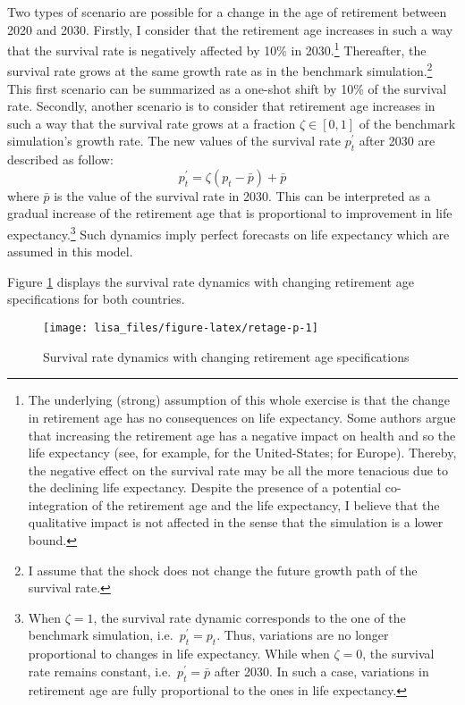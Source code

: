 \documentclass[
]{article}
\begin{document}
Two types of scenario are possible for a change in the age of retirement between 2020 and 2030. Firstly, I consider that the retirement age increases in such a way that the survival rate is negatively affected by 10\% in 2030.\footnote{The underlying (strong) assumption of this whole exercise is that the change in retirement age has no consequences on life expectancy. Some authors argue that increasing the retirement age has a negative impact on health and so the life expectancy (see, for example, \citet{Insler2014} for the United-States; \citet{Coe2011} for Europe). Thereby, the negative effect on the survival rate may be all the more tenacious due to the declining life expectancy. Despite the presence of a potential co-integration of the retirement age and the life expectancy, I believe that the qualitative impact is not affected in the sense that the simulation is a lower bound.} Thereafter, the survival rate grows at the same growth rate as in the benchmark simulation.\footnote{I assume that the shock does not change the future growth path of the survival rate.} This first scenario can be summarized as a one-shot shift by 10\% of the survival rate. Secondly, another scenario is to consider that retirement age increases in such a way that the survival rate grows at a fraction \(\zeta \in \left[0,1\right]\) of the benchmark simulation's growth rate. The new values of the survival rate \(p^\prime_t\) after 2030 are described as follow:
\begin{equation*}
    p^\prime_t = \zeta(p_t - \bar{p}) + \bar{p}
\end{equation*}
where \(\bar{p}\) is the value of the survival rate in 2030. This can be interpreted as a gradual increase of the retirement age that is proportional to improvement in life expectancy.\footnote{When \(\zeta = 1\), the survival rate dynamic corresponds to the one of the benchmark simulation, i.e.~\(p_t^\prime = p_t\). Thus, variations are no longer proportional to changes in life expectancy. While when \(\zeta = 0\), the survival rate remains constant, i.e.~\(p_t^\prime = \bar{p}\) after 2030. In such a case, variations in retirement age are fully proportional to the ones in life expectancy.} Such dynamics imply perfect forecasts on life expectancy which are assumed in this model.

Figure \ref{fig:retage-p} displays the survival rate dynamics with changing retirement age specifications for both countries.

\begin{figure}[!tb]

{\centering \texttt{[image: lisa\_files/figure-latex/retage-p-1]} 

}

\caption{Survival rate dynamics with changing retirement age specifications}\label{fig:retage-p}
\end{figure}
\end{document}

